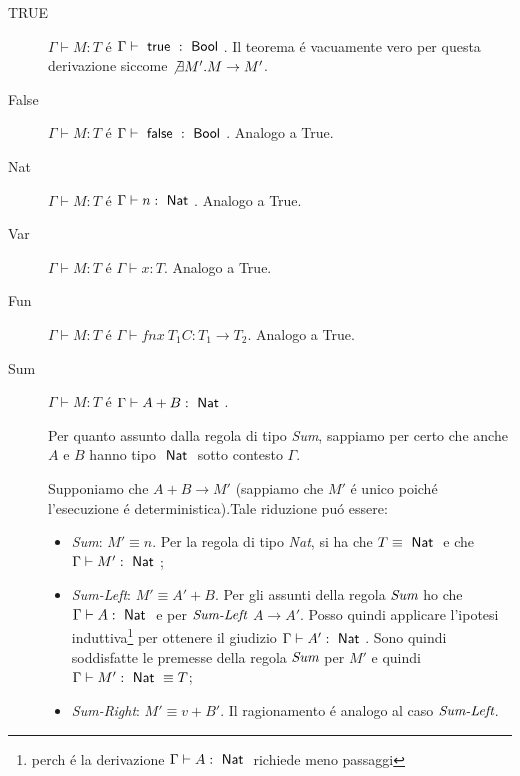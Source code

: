 
\begin{description}


 \item[TRUE] $\Gamma \vdash{} M : T$ \'e $\Gamma \vdash{} \true{} :
  \Bool$.
  Il teorema \'e vacuamente vero per questa derivazione siccome
  $\not \exists{M'}. M \to{} M'$.
  
 \item[False]
  $\Gamma \vdash{} M : T$ \'e $\Gamma \vdash{} \false{} : \Bool$.
  Analogo a True.

\item[Nat]
  $\Gamma \vdash{} M : T$ \'e $\Gamma \vdash{} n : \Nat$. Analogo a True.

\item[Var] $\Gamma \vdash{} M : T$ \'e $\Gamma \vdash{} x : T$.
  Analogo a True.

\item[Fun] $\Gamma \vdash{} M : T$ \'e
  $\Gamma \vdash{} fn x\:T_1 C : T_1 \to{} T_2$. Analogo a True.
  
  \item[Sum]
  $\Gamma \vdash{} M : T$ \'e $\Gamma \vdash{} A + B : \Nat$.
 
  Per quanto assunto dalla regola di tipo \emph{Sum}, sappiamo per certo che
  anche $A$ e $B$ hanno tipo $\Nat$ sotto contesto $\Gamma$.

  Supponiamo che $A + B \to{} M'$ (sappiamo che $M'$ \'e unico poich\'e l'esecuzione
   \'e  deterministica).Tale riduzione pu\'o essere:

  \begin{itemize}
    \item \emph{Sum}: $M' \equiv{} n$. Per la regola di tipo
      \emph{Nat}, si ha che $T \equiv{} \Nat$ e che
      $\Gamma{} \vdash{} M' : \Nat$;
    \item \emph{Sum-Left}: $M' \equiv{} A' + B$. 
    Per gli assunti della regola $\emph{Sum}$ ho che $\Gamma \vdash A : \Nat$ e per $\emph{Sum-Left}$ $A \to A'$.
    Posso quindi applicare l'ipotesi induttiva\footnote{perch \'e  la derivazione $\Gamma \vdash A :\Nat$ richiede meno passaggi}
    per ottenere il giudizio $ \Gamma \vdash A' : \Nat$.
    Sono quindi soddisfatte le premesse della regola $\emph{Sum}$ per $M'$ e quindi  $\Gamma{} \vdash{} M' : \Nat \equiv T$;

    \item \emph{Sum-Right}: $M' \equiv{} v + B'$. Il ragionamento  \'e  analogo al caso $\emph{Sum-Left}$.
  \end{itemize}


\end{description}
